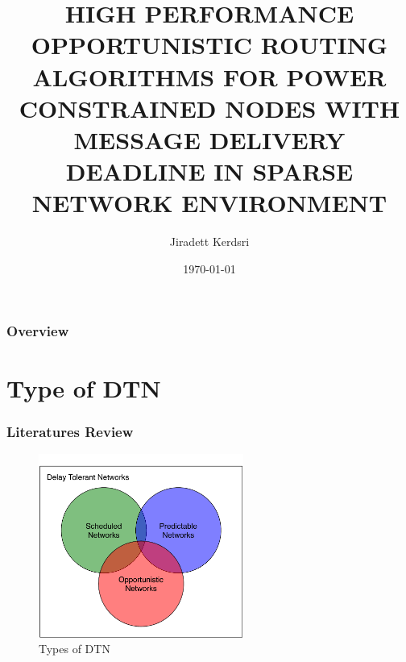 \documentclass{beamer}
\title[Thesis]{HIGH PERFORMANCE OPPORTUNISTIC ROUTING ALGORITHMS FOR POWER CONSTRAINED NODES WITH MESSAGE DELIVERY DEADLINE IN SPARSE NETWORK ENVIRONMENT} %
\author{Jiradett Kerdsri} %
\institute[SIIT] %
{
Sirindhorn International Institute of Technology,
Thammasat University \\ %
\medskip
\textit{jiradett.k@dti.or.th} %
}
\date{\today} %
\begin{document}
\begin{frame}
\titlepage %
\end{frame}
\begin{frame}
\frametitle{Overview} %
\tableofcontents %
\end{frame}
\section{Type of DTN}
\begin{frame}
	\frametitle{Literatures Review}
\begin{figure}
\centering
\includegraphics[width=0.6\textwidth]{Figures/TypeOfDTN.pdf}
\caption{Types of DTN}
\label{fig:bg:Type of DTN}
\end{figure} 
\end{frame}

\end{document}
